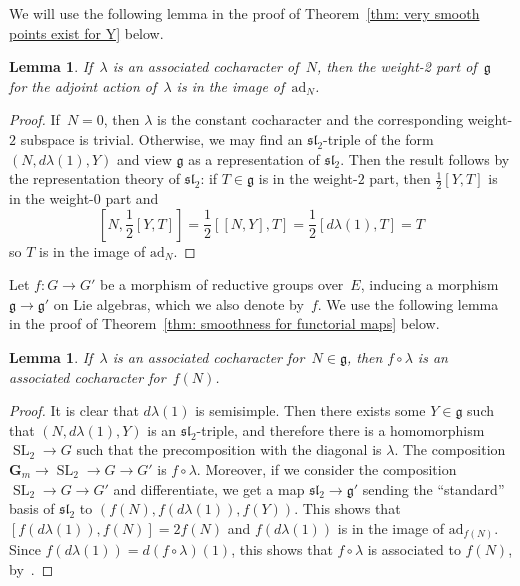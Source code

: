\documentclass{amsart}
\renewcommand{\mathbb}{\mathbf}
\DeclareMathOperator{\SL}{SL}
\def\sl{\mathfrak{sl}}
\def\ad{\mathrm{ad}}
\def\sl{\mathfrak{sl}}
\newtheorem{lem}[subsubsection]{Lemma}
\theoremstyle{definition}
\theoremstyle{remark}
\newcommand{\mar}[1]{}
\newcommand{\mar}[1]{\marginpar{\raggedright\tiny squirrel #1}}
\newcommand{\GG}{{\mathbb G}}
\def\sl{\mathfrak{sl}}
\newcommand{\Gm}{\GG_m}
\begin{document}
We will use the following lemma in the proof of Theorem~\ref{thm: very
  smooth points exist for Y} below.
  \begin{lem}
    \label{lem: associated cochars weight 2 adN}If~$\lambda$ is an
    associated cocharacter of~$N$, then the weight-2 part
    of~$\mathfrak{g}$ for the adjoint action of~$\lambda$ is in the
    image of~$\ad_N$.
  \end{lem}
  \begin{proof}If~$N=0$, then $\lambda$ is the constant cocharacter and the corresponding weight-$2$ subspace is trivial. Otherwise, we may find an $\sl_2$-triple of the form $(N,d\lambda(1),Y)$ and view $\mathfrak{g}$ as a representation of $\sl_2$.  Then the result follows by the representation theory of $\mathfrak{sl}_2$: if $T\in\mathfrak{g}$ is in the weight-$2$ part, then $\frac 1 2 [Y,T]$ is in the weight-$0$ part and 
\[	[N,\frac 1 2 [Y,T]]=\frac 1 2 [[N,Y],T]=\frac 1 2[d\lambda(1),T] = T	\]
so $T$ is in the image of $\ad_N$.%
  \end{proof}
  Let $f:G\to G'$ be a morphism of reductive groups over~$E$, inducing
  a morphism $\mathfrak{g}\to\mathfrak{g'}$ on Lie algebras, which we
  also denote by~$f$. We use the following lemma in the proof of
  Theorem~\ref{thm: smoothness for functorial maps} below.
  \begin{lem}
    \label{lem: associated cochars functoriality}If~$\lambda$ is an
    associated cocharacter for~$N\in\mathfrak{g}$, then
    $f\circ\lambda$ is an associated cocharacter for~$f(N)$.
  \end{lem}
  \begin{proof}
It is clear that $d\lambda(1)$ is semisimple.  Then there exists some $Y\in\mathfrak{g}$ such that $(N,d\lambda(1),Y)$ is an $\sl_2$-triple, and therefore there is a homomorphism $\SL_2\rightarrow G$ such that the precomposition with the diagonal is $\lambda$.  The composition $\Gm\rightarrow\SL_2\rightarrow G\rightarrow G'$ is $f\circ \lambda$.  Moreover, if we consider the composition $\SL_2\rightarrow G\rightarrow G'$ and differentiate, we get a map $\sl_2\rightarrow\mathfrak{g}'$ sending the ``standard'' basis of $\sl_2$ to $(f(N),f(d\lambda(1)),f(Y))$.  This shows that $[f(d\lambda(1)),f(N)]=2f(N)$ and $f(d\lambda(1))$ is in the image of $\ad_{f(N)}$.  Since $f(d\lambda(1))=d(f\circ\lambda)(1)$, this shows that $f\circ\lambda$ is associated to $f(N)$, by~\cite[Prop.\ 5.5]{jantzen}.
  \end{proof}
\end{document}
